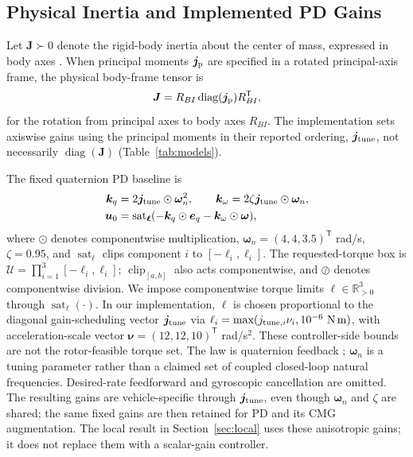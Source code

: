 \documentclass[letterpaper, 10 pt, conference]{ieeeconf}
\newcommand{\T}{^{\mathsf T}}
\newcommand{\sat}{\operatorname{sat}}
\newcommand{\clip}{\operatorname{clip}}
\begin{document}
\subsection{Physical Inertia and Implemented PD Gains}
Let $\bm J\succ0$ denote the rigid-body inertia about the center of mass, expressed in body axes \cite{schaub2018amss}. When principal moments $\bm j_{\rm p}$ are specified in a rotated principal-axis frame, the physical body-frame tensor is
\begin{equation}
 \bm J=R_{BI}\operatorname{diag}(\bm j_{\rm p})R_{BI}\T,
 \label{eq:inertiaframe}
\end{equation}
for the rotation from principal axes to body axes $R_{BI}$. The implementation sets axiswise gains using the principal moments in their reported ordering, $\bm j_{\rm tune}$, not necessarily $\operatorname{diag}(\bm J)$ (Table~\ref{tab:models}).

The fixed quaternion PD baseline is
\begin{align}
 \bm k_q&=2\bm j_{\rm tune}\odot\bm\omega_n^2,\qquad
 \bm k_\omega=2\zeta\bm j_{\rm tune}\odot\bm\omega_n,\\
 \bm u_0&=\sat_{\bm\ell}
       (-\bm k_q\odot\bm e_q-\bm k_\omega\odot\bm\omega),
 \label{eq:pd}
\end{align}
where $\odot$ denotes componentwise multiplication,
$\bm\omega_n=(4,4,3.5)\T$ rad/s, $\zeta=0.95$, and
$\sat_{\bm\ell}$ clips component $i$ to $[-\ell_i,\ell_i]$.
%
The requested-torque box is $\mathcal U=\prod_{i=1}^3[-\ell_i,\ell_i]$;
$\clip_{[a,b]}$ also acts componentwise, and $\oslash$ denotes componentwise division.
We impose componentwise torque limits $\bm\ell\in\mathbb R_{>0}^3$ through $\sat_{\bm\ell}(\cdot)$. In our implementation, $\bm\ell$ is chosen proportional to the diagonal gain-scheduling vector $\bm j_{\rm tune}$ via
$\ell_i=\max(j_{{\rm tune},i}\nu_i,10^{-6}\ \mathrm{N\,m})$,
with acceleration-scale vector $\bm\nu=(12,12,10)\T$ rad/s$^2$.
These controller-side bounds are not the rotor-feasible torque set.
%
The law is quaternion feedback \cite{fresk2013quaternion}; $\bm\omega_n$ is a tuning parameter rather than a claimed set of coupled closed-loop natural frequencies.
Desired-rate feedforward and gyroscopic cancellation are omitted.
The resulting gains are vehicle-specific through $\bm j_{\rm tune}$, even though
$\bm\omega_n$ and $\zeta$ are shared; the same fixed gains are then retained
for PD and its CMG augmentation.
The local result in Section~\ref{sec:local} uses these anisotropic gains; it does not replace them with a scalar-gain controller.
%
\end{document}
